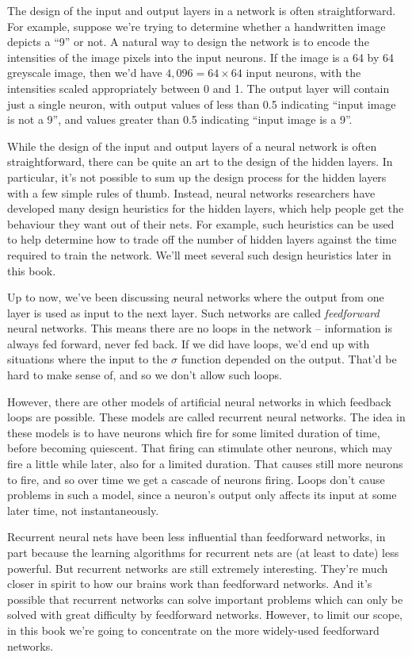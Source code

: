 \documentclass[a4paper,twoside,10pt]{book}
\begin{document}
The design of the input and output layers in a network is often straightforward. For example, suppose we're trying to determine whether a handwritten image depicts a ``9'' or not. A natural way to design the network is to encode the intensities of the image pixels into the input neurons. If the image is a 64 by 64 greyscale image, then we'd have $4,096=64\times64$ input neurons, with the intensities scaled appropriately between 0 and 1. The output layer will contain just a single neuron, with output values of less than 0.5 indicating ``input image is not a 9'', and values greater than 0.5 indicating ``input image is a 9''.

While the design of the input and output layers of a neural network is often straightforward, there can be quite an art to the design of the hidden layers. In particular, it's not possible to sum up the design process for the hidden layers with a few simple rules of thumb. Instead, neural networks researchers have developed many design heuristics for the hidden layers, which help people get the behaviour they want out of their nets. For example, such heuristics can be used to help determine how to trade off the number of hidden layers against the time required to train the network. We'll meet several such design heuristics later in this book.

Up to now, we've been discussing neural networks where the output from one layer is used as input to the next layer. Such networks are called \textit{feedforward} neural networks. This means there are no loops in the network -- information is always fed forward, never fed back. If we did have loops, we'd end up with situations where the input to the $\sigma$ function depended on the output. That'd be hard to make sense of, and so we don't allow such loops.

However, there are other models of artificial neural networks in which feedback loops are possible. These models are called recurrent neural networks. The idea in these models is to have neurons which fire for some limited duration of time, before becoming quiescent. That firing can stimulate other neurons, which may fire a little while later, also for a limited duration. That causes still more neurons to fire, and so over time we get a cascade of neurons firing. Loops don't cause problems in such a model, since a neuron's output only affects its input at some later time, not instantaneously.

Recurrent neural nets have been less influential than feedforward networks, in part because the learning algorithms for recurrent nets are (at least to date) less powerful. But recurrent networks are still extremely interesting. They're much closer in spirit to how our brains work than feedforward networks. And it's possible that recurrent networks can solve important problems which can only be solved with great difficulty by feedforward networks. However, to limit our scope, in this book we're going to concentrate on the more widely-used feedforward networks.
\end{document}
